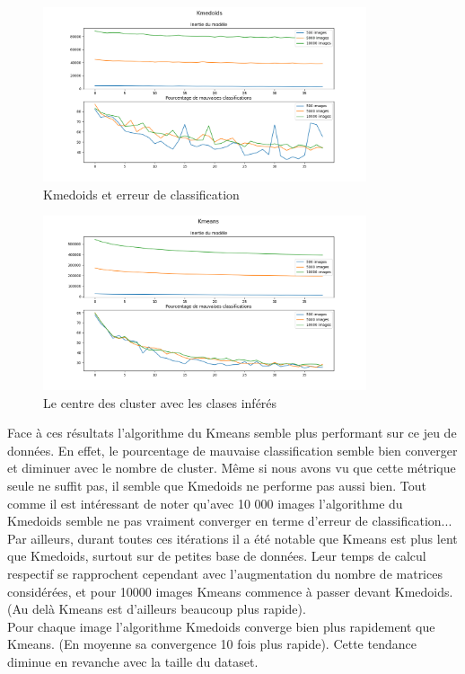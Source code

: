 \documentclass{article}
\begin{document}
\begin{figure}[H]
	\centering
	\includegraphics[width=0.85\textwidth]{"./Images/Kmedoids_no_prepo_erreur.png"}
	\caption{\centering Kmedoids et erreur de classification}
\end{figure}
\begin{figure}[H]
	\centering
	\includegraphics[width=0.85\textwidth]{"./Images/Kmeans_no_prepo_erreur.png"}
	\caption{\centering Le centre des cluster avec les clases inférés}
\end{figure}

Face à ces résultats l'algorithme du Kmeans semble plus performant sur ce jeu de données. En effet, le pourcentage de mauvaise classification semble bien converger et diminuer avec le nombre de cluster. Même si nous avons vu que cette métrique seule ne suffit pas, il semble que Kmedoids ne performe pas aussi bien. Tout comme il est intéressant de noter qu'avec 10 000 images l'algorithme du Kmedoids semble ne pas vraiment converger en terme d'erreur de classification...
\\
Par ailleurs, durant toutes ces itérations il a été notable que Kmeans est plus lent que Kmedoids, surtout sur de petites base de données. Leur temps de calcul respectif se rapprochent cependant avec l'augmentation du nombre de matrices considérées, et pour 10000 images Kmeans commence à passer devant Kmedoids. (Au delà Kmeans est d'ailleurs beaucoup plus rapide). \\
 Pour chaque image l'algorithme Kmedoids converge bien plus rapidement que Kmeans. (En moyenne sa convergence 10 fois plus rapide). Cette tendance diminue en revanche avec la taille du dataset.
\end{document}
